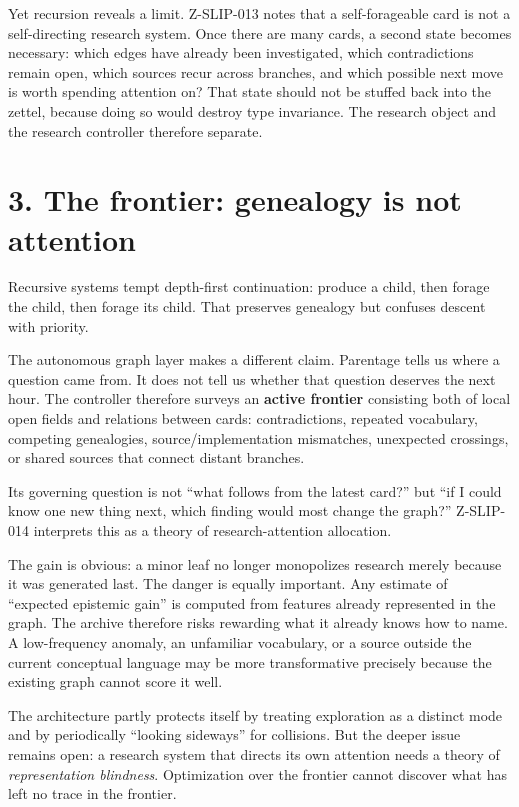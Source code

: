 \documentclass[
  11pt,
]{article}
\begin{document}
Yet recursion reveals a limit. Z-SLIP-013 notes that a self-forageable
card is not a self-directing research system. Once there are many cards,
a second state becomes necessary: which edges have already been
investigated, which contradictions remain open, which sources recur
across branches, and which possible next move is worth spending
attention on? That state should not be stuffed back into the zettel,
because doing so would destroy type invariance. The research object and
the research controller therefore separate.

\section{3. The frontier: genealogy is not
attention}\label{the-frontier-genealogy-is-not-attention}

Recursive systems tempt depth-first continuation: produce a child, then
forage the child, then forage its child. That preserves genealogy but
confuses descent with priority.

The autonomous graph layer makes a different claim. Parentage tells us
where a question came from. It does not tell us whether that question
deserves the next hour. The controller therefore surveys an
\textbf{active frontier} consisting both of local open fields and
relations between cards: contradictions, repeated vocabulary, competing
genealogies, source/implementation mismatches, unexpected crossings, or
shared sources that connect distant branches.

Its governing question is not ``what follows from the latest card?'' but
``if I could know one new thing next, which finding would most change
the graph?'' Z-SLIP-014 interprets this as a theory of
research-attention allocation.

The gain is obvious: a minor leaf no longer monopolizes research merely
because it was generated last. The danger is equally important. Any
estimate of ``expected epistemic gain'' is computed from features
already represented in the graph. The archive therefore risks rewarding
what it already knows how to name. A low-frequency anomaly, an
unfamiliar vocabulary, or a source outside the current conceptual
language may be more transformative precisely because the existing graph
cannot score it well.

The architecture partly protects itself by treating exploration as a
distinct mode and by periodically ``looking sideways'' for collisions.
But the deeper issue remains open: a research system that directs its
own attention needs a theory of \emph{representation blindness}.
Optimization over the frontier cannot discover what has left no trace in
the frontier.
\end{document}
